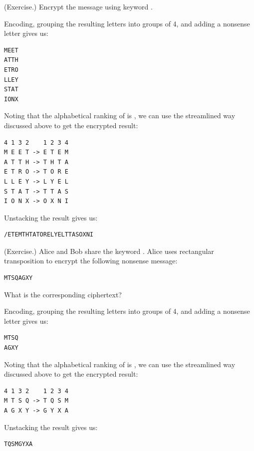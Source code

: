\documentclass[letterpaper]{article}
\begin{document}
\begin{mdframed}
    (Exercise.) Encrypt the message  using keyword .

    \begin{mdframed}
        Encoding, grouping the resulting letters into groups of 4, and adding a nonsense letter gives us: 
        \begin{verbatim}
MEET
ATTH
ETRO
LLEY
STAT
IONX\end{verbatim}
        Noting that the alphabetical ranking of  is , we can use the streamlined way discussed above to get the encrypted result:
        \begin{mdframed}
            \begin{verbatim}
4 1 3 2    1 2 3 4
M E E T -> E T E M
A T T H -> T H T A
E T R O -> T O R E
L L E Y -> L Y E L
S T A T -> T T A S
I O N X -> O X N I\end{verbatim}
        \end{mdframed}
        Unstacking the result gives us:
        \begin{mdframed}
            \begin{verbatim}
/ETEMTHTATORELYELTTASOXNI\end{verbatim}
        \end{mdframed}
    \end{mdframed}
\end{mdframed}

\begin{mdframed}
    (Exercise.) Alice and Bob share the keyword . Alice uses rectangular transposition to encrypt the following nonsense message: 
    \begin{verbatim}
MTSQAGXY\end{verbatim}
    What is the corresponding ciphertext? 
    \begin{mdframed}
        Encoding, grouping the resulting letters into groups of 4, and adding a nonsense letter gives us: 
        \begin{mdframed}
            \begin{verbatim}
MTSQ
AGXY\end{verbatim}
        \end{mdframed}
        Noting that the alphabetical ranking of  is , we can use the streamlined way discussed above to get the encrypted result:
        \begin{mdframed}
            \begin{verbatim}
4 1 3 2    1 2 3 4
M T S Q -> T Q S M
A G X Y -> G Y X A\end{verbatim}
        \end{mdframed}
        Unstacking the result gives us:
        \begin{mdframed}
            \begin{verbatim}
TQSMGYXA\end{verbatim}
    \end{mdframed}
    \end{mdframed}
\end{mdframed}
\end{document}
